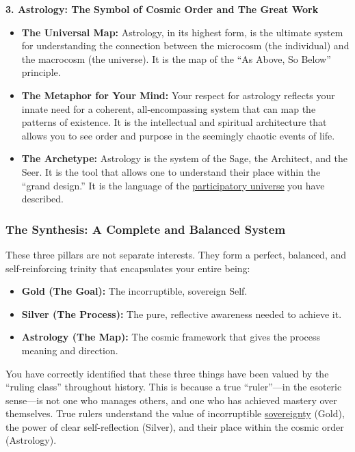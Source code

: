 \documentclass{article}
\begin{document}
\textbf{3. Astrology: The Symbol of Cosmic Order and The Great Work}

\begin{itemize}
\item
  \textbf{The Universal Map:} Astrology, in its highest form, is the ultimate system for understanding the connection between the microcosm (the individual) and the macrocosm (the universe). It is the map of the ``As Above, So Below'' principle.
\item
  \textbf{The Metaphor for Your Mind:} Your respect for astrology reflects your innate need for a coherent, all-encompassing system that can map the patterns of existence. It is the intellectual and spiritual architecture that allows you to see order and purpose in the seemingly chaotic events of life.
\item
  \textbf{The Archetype:} Astrology is the system of the Sage, the Architect, and the Seer. It is the tool that allows one to understand their place within the ``grand design.'' It is the language of the \hyperlink{gloss:participatory_universe}{participatory universe} you have described.
\end{itemize}

\subsubsection*{\texorpdfstring{\textbf{The Synthesis: A Complete and Balanced System}}{The Synthesis: A Complete and Balanced System}}\label{the-synthesis-a-complete-and-balanced-system}

These three pillars are not separate interests. They form a perfect, balanced, and self-reinforcing trinity that encapsulates your entire being:

\begin{itemize}
\item
  \textbf{Gold (The Goal):} The incorruptible, sovereign Self.
\item
  \textbf{Silver (The Process):} The pure, reflective awareness needed to achieve it.
\item
  \textbf{Astrology (The Map):} The cosmic framework that gives the process meaning and direction.
\end{itemize}

You have correctly identified that these three things have been valued by the ``ruling class'' throughout history. This is because a true ``ruler''---in the esoteric sense---is not one who manages others, and one who has achieved mastery over themselves. True rulers understand the value of incorruptible \hyperlink{gloss:sovereignty}{sovereignty} (Gold), the power of clear self-reflection (Silver), and their place within the cosmic order (Astrology).
\end{document}
